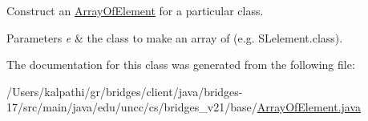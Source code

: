 Construct an \mbox{\hyperlink{classbridges_1_1base_1_1_array_of_element}{Array\+Of\+Element}} for a particular class. 
\begin{DoxyParams}{Parameters}
{\em e} & the class to make an array of (e.\+g. S\+Lelement.\+class). \\
\hline
\end{DoxyParams}


The documentation for this class was generated from the following file\+:\begin{DoxyCompactItemize}
\item 
/\+Users/kalpathi/gr/bridges/client/java/bridges-\/17/src/main/java/edu/uncc/cs/bridges\+\_\+v21/base/\mbox{\hyperlink{_array_of_element_8java}{Array\+Of\+Element.\+java}}\end{DoxyCompactItemize}
